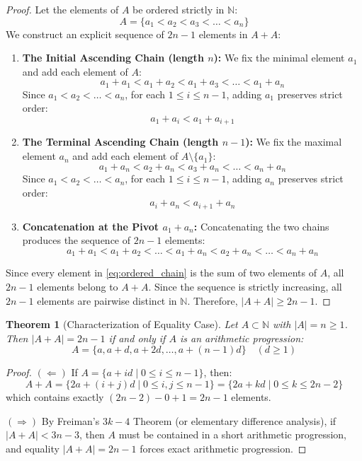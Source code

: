 \documentclass[11pt,a4paper]{article}
\newtheorem{theorem}{Theorem}[section]
\theoremstyle{definition}
\begin{document}
\begin{proof}
Let the elements of $A$ be ordered strictly in $\mathbb{N}$:
\[ A = \{a_1 < a_2 < a_3 < \dots < a_n\} \]
We construct an explicit sequence of $2n - 1$ elements in $A + A$:
\begin{enumerate}
    \item \textbf{The Initial Ascending Chain (length $n$):}
    We fix the minimal element $a_1$ and add each element of $A$:
    \[ a_1 + a_1 < a_1 + a_2 < a_1 + a_3 < \dots < a_1 + a_n \]
    Since $a_1 < a_2 < \dots < a_n$, for each $1 \le i \le n-1$, adding $a_1$ preserves strict order:
    \[ a_1 + a_i < a_1 + a_{i+1} \]
    \item \textbf{The Terminal Ascending Chain (length $n-1$):}
    We fix the maximal element $a_n$ and add each element of $A \setminus \{a_1\}$:
    \[ a_1 + a_n < a_2 + a_n < a_3 + a_n < \dots < a_n + a_n \]
    Since $a_1 < a_2 < \dots < a_n$, for each $1 \le i \le n-1$, adding $a_n$ preserves strict order:
    \[ a_i + a_n < a_{i+1} + a_n \]
    \item \textbf{Concatenation at the Pivot $a_1 + a_n$:}
    Concatenating the two chains produces the sequence of $2n - 1$ elements:
    \begin{equation}\label{eq:ordered_chain}
    a_1 + a_1 < a_1 + a_2 < \dots < a_1 + a_n < a_2 + a_n < \dots < a_n + a_n
    \end{equation}
\end{enumerate}
Since every element in \eqref{eq:ordered_chain} is the sum of two elements of $A$, all $2n - 1$ elements belong to $A + A$.
Since the sequence is strictly increasing, all $2n - 1$ elements are pairwise distinct in $\mathbb{N}$.
Therefore, $|A + A| \ge 2n - 1$.
\end{proof}

\begin{theorem}[Characterization of Equality Case]\label{thm:equality}
Let $A \subset \mathbb{N}$ with $|A| = n \ge 1$. Then $|A + A| = 2n - 1$ if and only if $A$ is an arithmetic progression:
\[ A = \{a, a + d, a + 2d, \dots, a + (n-1)d\} \quad (d \ge 1) \]
\end{theorem}

\begin{proof}
$(\Leftarrow)$ If $A = \{a + id \mid 0 \le i \le n-1\}$, then:
\[ A + A = \{2a + (i+j)d \mid 0 \le i, j \le n-1\} = \{2a + k d \mid 0 \le k \le 2n-2\} \]
which contains exactly $(2n-2) - 0 + 1 = 2n-1$ elements.

$(\Rightarrow)$ By Freiman's $3k-4$ Theorem (or elementary difference analysis), if $|A+A| < 3n-3$, then $A$ must be contained in a short arithmetic progression, and equality $|A+A| = 2n-1$ forces exact arithmetic progression.
\end{proof}
\end{document}
